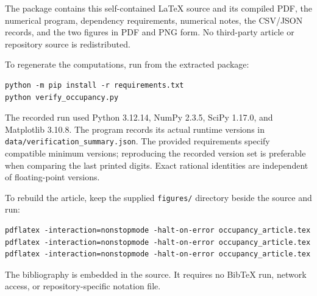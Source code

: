 \documentclass[11pt,a4paper]{article}
\numberwithin{equation}{section}
\theoremstyle{definition}
\theoremstyle{remark}
\begin{document}
The package contains this self-contained LaTeX source and its compiled
PDF, the numerical program, dependency requirements, numerical notes,
the CSV/JSON records, and the two figures in PDF and PNG form.
No third-party article or repository source is redistributed.

To regenerate the computations, run from the extracted package:
\begin{verbatim}
python -m pip install -r requirements.txt
python verify_occupancy.py
\end{verbatim}
The recorded run used Python 3.12.14, NumPy 2.3.5, SciPy 1.17.0, and
Matplotlib 3.10.8. The program records its actual runtime versions in
\texttt{data/verification\_summary.json}. The provided requirements
specify compatible minimum versions; reproducing the recorded version
set is preferable when comparing the last printed digits. Exact rational
identities are independent of floating-point versions.

To rebuild the article, keep the supplied \texttt{figures/} directory
beside the source and run:
\begin{verbatim}
pdflatex -interaction=nonstopmode -halt-on-error occupancy_article.tex
pdflatex -interaction=nonstopmode -halt-on-error occupancy_article.tex
pdflatex -interaction=nonstopmode -halt-on-error occupancy_article.tex
\end{verbatim}
The bibliography is embedded in the source. It requires no BibTeX run,
network access, or repository-specific notation file.
\end{document}
